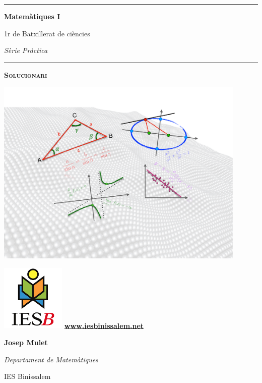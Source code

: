 \documentclass[a4paper, pdf, twoside]{book}
\begin{document}
\thispagestyle{empty}
\pagestyle{plain}
\renewcommand{\headrulewidth}{0pt}
\begin{center}
\vspace*{0.5cm}\hrule\vspace{0.5cm}
\Huge \textbf{Matemàtiques I} \par
\Large 1r de Batxillerat de ciències\par
\large \textit{Sèrie Pràctica}\par
\vspace{0.5cm}\hrule\vspace{0.5cm}
\Huge \textbf{\textsc{Solucionari}} \par \vspace{1.5cm}
	\includegraphics[width=0.9\textwidth]{img-00/portada}   

	\vspace{1.5cm}  
	\begin{minipage}{0.4\textwidth}  
		\begin{center}  
			\includegraphics*[width=1.2in]{img-00/ies-binissalem-logo}  
			\small  
			\noindent \href{www.iesbinissalem.net}{\textbf{www.iesbinissalem.net}}  
		\end{center}  
	\end{minipage}  
	\begin{minipage}{0.4\textwidth}  
		\begin{flushright}  
			\normalsize \textbf{Josep Mulet}\par 
			\textit{Departament de Matemàtiques}\par   
			IES Binissalem  
		\end{flushright}  
	\end{minipage}   
	\end{center}   
\end{document}
